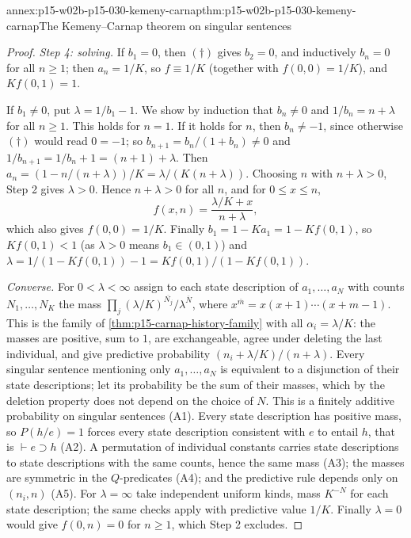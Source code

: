 \begin{annexitem}{annex:p15-w02b-p15-030-kemeny-carnap}{thm:p15-w02b-p15-030-kemeny-carnap}{The Kemeny--Carnap theorem on singular sentences}
\begin{proof}
\emph{Step 4: solving.} If \(b_1=0\), then \((\dagger)\) gives \(b_2=0\), and
inductively \(b_n=0\) for all \(n\geq1\); then \(a_n=1/K\), so \(f\equiv1/K\)
(together with \(f(0,0)=1/K\)), and \(Kf(0,1)=1\).

If \(b_1\neq0\), put \(\lambda=1/b_1-1\). We show by induction that
\(b_n\neq0\) and \(1/b_n=n+\lambda\) for all \(n\geq1\). This holds for \(n=1\).
If it holds for \(n\), then \(b_n\neq-1\), since otherwise \((\dagger)\) would
read \(0=-1\); so \(b_{n+1}=b_n/(1+b_n)\neq0\) and
\(1/b_{n+1}=1/b_n+1=(n+1)+\lambda\). Then
\(a_n=(1-n/(n+\lambda))/K=\lambda/(K(n+\lambda))\). Choosing \(n\) with
\(n+\lambda>0\), Step 2 gives \(\lambda>0\). Hence \(n+\lambda>0\) for all \(n\),
and for \(0\leq x\leq n\),
\[
 f(x,n)=\frac{\lambda/K+x}{n+\lambda},
\]
which also gives \(f(0,0)=1/K\). Finally \(b_1=1-Ka_1=1-Kf(0,1)\), so
\(Kf(0,1)<1\) (as \(\lambda>0\) means \(b_1\in(0,1)\)) and
\(\lambda=1/(1-Kf(0,1))-1=Kf(0,1)/(1-Kf(0,1))\).

\emph{Converse.} For \(0<\lambda<\infty\) assign to each state description of
\(a_1,\ldots,a_N\) with counts \(N_1,\ldots,N_K\) the mass
\(\prod_j(\lambda/K)^{\overline{N_j}}/\lambda^{\overline N}\), where
\(x^{\overline m}=x(x+1)\cdots(x+m-1)\). This is the family of
\cref{thm:p15-carnap-history-family} with all \(\alpha_i=\lambda/K\): the masses
are positive, sum to \(1\), are exchangeable, agree under deleting the last
individual, and give predictive probability \((n_i+\lambda/K)/(n+\lambda)\).
Every singular sentence mentioning only \(a_1,\ldots,a_N\) is equivalent to a
disjunction of their state descriptions; let its probability be the sum of
their masses, which by the deletion property does not depend on the choice
of \(N\). This is a finitely additive probability on singular sentences
(A1). Every state description has positive mass, so \(P(h/e)=1\) forces every
state description consistent with \(e\) to entail \(h\), that is
\(\vdash e\supset h\) (A2). A permutation of individual constants carries
state descriptions to state descriptions with the same counts, hence the
same mass (A3); the masses are symmetric in the \(Q\)-predicates (A4); and
the predictive rule depends only on \((n_i,n)\) (A5). For \(\lambda=\infty\)
take independent uniform kinds, mass \(K^{-N}\) for each state description;
the same checks apply with predictive value \(1/K\). Finally \(\lambda=0\)
would give \(f(0,n)=0\) for \(n\geq1\), which Step 2 excludes.
\end{proof}
\end{annexitem}

